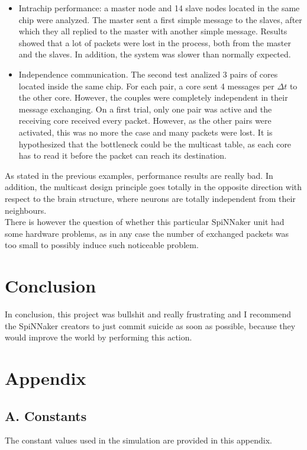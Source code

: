 \documentclass{article}
\begin{document}
\begin{itemize}
\item Intrachip performance: a master node and 14 slave nodes located in the same chip were analyzed. The master sent a first simple message to the slaves, after which they all replied to the master with another simple message. Results showed that a lot of packets were lost in the process, both from the master and the slaves. In addition, the system was slower than normally expected.

\item Independence communication. The second test analized 3 pairs of cores located inside the same chip. For each pair, a core sent 4 messages per \(\Delta t\) to the other core. However, the couples were completely independent in their message exchanging. On a first trial, only one pair was active and the receiving core received every packet. However, as the other pairs were activated, this was no more the case and many packets were lost. It is hypothesized that the bottleneck could be the multicast table, as each core has to read it before the packet can reach its destination.
\end{itemize}

As stated in the previous examples, performance results are really bad. In addition, the multicast design principle goes totally in the opposite direction with respect to the brain structure, where neurons are totally independent from their neighbours. \\
There is however the question of whether this particular SpiNNaker unit had some hardware problems, as in any case the number of exchanged packets was too small to possibly induce such noticeable problem.


\section{Conclusion}
In conclusion, this project was bullshit and really frustrating and I recommend the SpiNNaker creators to just commit suicide as soon as possible, because they would improve the world by performing this action.



\section{Appendix}
\subsection*{A. Constants}
The constant values used in the simulation are provided in this appendix.
\end{document}
